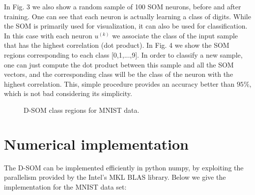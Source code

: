 \documentclass[10pt,english]{article}
\begin{document}
In Fig. 3 we also show a random sample of 100 SOM neurons, before and after training. One can see that each neuron is actually learning 
a class of digits. 
While the SOM is primarily used for visualization, it can also be used for classification. 
In this case with each neuron $u^{(k)}$ we associate the class of the input sample that has the highest correlation (dot product). 
In Fig. 4 we show the SOM regions corresponding to each class [0,1,...,9]. 
In order to classify a new sample, one can just compute the dot product between this sample and all the SOM vectors, and the corresponding 
class will be the class of the neuron with the highest correlation. This, simple procedure provides an accuracy better than $95\%$, which is not bad 
considering its simplicity.

\begin{figure}[t!]
\centering
{}
\qquad
{}
\qquad
{}
\qquad
{}

\qquad
{}
\qquad
{}
\qquad
{}

\qquad
{}

\caption{D-SOM class regions for MNIST data.}
\end{figure}


\section{Numerical implementation}

The D-SOM can be implemented efficiently in python numpy, by exploiting the parallelism provided by the Intel's MKL BLAS library. 
Below we give the implementation for the MNIST data set:
\end{document}
